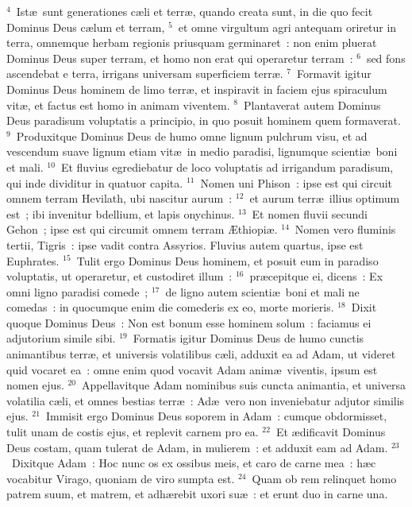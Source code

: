 ${}^{4}$~Ist\ae\ sunt generationes c\ae li et terr\ae , quando creata sunt, in die quo fecit Dominus Deus c\ae lum et terram,
${}^{5}$~et omne virgultum agri antequam oriretur in terra, omnemque herbam regionis priusquam germinaret~: non enim pluerat Dominus Deus super terram, et homo non erat qui operaretur terram~:
${}^{6}$~sed fons ascendebat e terra, irrigans universam superficiem terr\ae .
${}^{7}$~Formavit igitur Dominus Deus hominem de limo terr\ae , et inspiravit in faciem ejus spiraculum vit\ae , et factus est homo in animam viventem.
${}^{8}$~Plantaverat autem Dominus Deus paradisum voluptatis a principio, in quo posuit hominem quem formaverat.
${}^{9}$~Produxitque Dominus Deus de humo omne lignum pulchrum visu, et ad vescendum suave lignum etiam vit\ae\ in medio paradisi, lignumque scienti\ae\ boni et mali.
${}^{10}$~Et fluvius egrediebatur de loco voluptatis ad irrigandum paradisum, qui inde dividitur in quatuor capita.
${}^{11}$~Nomen uni Phison~: ipse est qui circuit omnem terram Hevilath, ubi nascitur aurum~:
${}^{12}$~et aurum terr\ae\ illius optimum est~; ibi invenitur bdellium, et lapis onychinus.
${}^{13}$~Et nomen fluvii secundi Gehon~; ipse est qui circumit omnem terram \AE thiopi\ae .
${}^{14}$~Nomen vero fluminis tertii, Tigris~: ipse vadit contra Assyrios. Fluvius autem quartus, ipse est Euphrates.
${}^{15}$~Tulit ergo Dominus Deus hominem, et posuit eum in paradiso voluptatis, ut operaretur, et custodiret illum~:
${}^{16}$~pr\ae cepitque ei, dicens~: Ex omni ligno paradisi comede~;
${}^{17}$~de ligno autem scienti\ae\ boni et mali ne comedas~: in quocumque enim die comederis ex eo, morte morieris.
${}^{18}$~Dixit quoque Dominus Deus~: Non est bonum esse hominem solum~: faciamus ei adjutorium simile sibi.
${}^{19}$~Formatis igitur Dominus Deus de humo cunctis animantibus terr\ae , et universis volatilibus c\ae li, adduxit ea ad Adam, ut videret quid vocaret ea~: omne enim quod vocavit Adam anim\ae\ viventis, ipsum est nomen ejus.
${}^{20}$~Appellavitque Adam nominibus suis cuncta animantia, et universa volatilia c\ae li, et omnes bestias terr\ae~: Ad\ae\ vero non inveniebatur adjutor similis ejus.
${}^{21}$~Immisit ergo Dominus Deus soporem in Adam~: cumque obdormisset, tulit unam de costis ejus, et replevit carnem pro ea.
${}^{22}$~Et \ae dificavit Dominus Deus costam, quam tulerat de Adam, in mulierem~: et adduxit eam ad Adam.
${}^{23}$~Dixitque Adam~: Hoc nunc os ex ossibus meis, et caro de carne mea~: h\ae c vocabitur Virago, quoniam de viro sumpta est.
${}^{24}$~Quam ob rem relinquet homo patrem suum, et matrem, et adh\ae rebit uxori su\ae~: et erunt duo in carne una.
